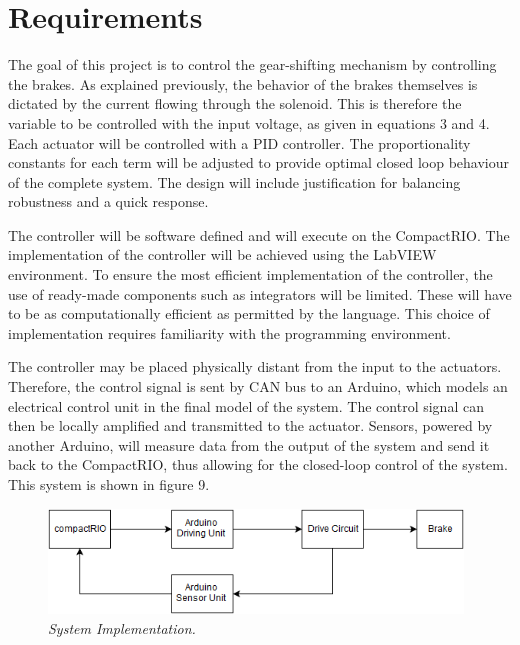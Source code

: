 \documentclass{article}
\begin{document}
\section{Requirements}
\begin{flushleft}
The goal of this project is to control the gear-shifting mechanism by controlling the brakes. As explained previously, the behavior of the brakes themselves is dictated by the current flowing through the solenoid. This is therefore the variable to be controlled with the input voltage, as given in equations 3 and 4. Each actuator will be controlled with a PID controller. The proportionality constants for each term will be adjusted to provide optimal closed loop behaviour of the complete system. The design will include justification for balancing robustness and a quick response. 
\end{flushleft}

\begin{flushleft}
The controller will be software defined and will execute on the CompactRIO. The implementation of the controller will be achieved using the LabVIEW environment. To ensure the most efficient implementation of the controller, the use of ready-made components such as integrators will be limited. These will have to be as computationally efficient as permitted by the language. This choice of implementation requires familiarity with the programming environment. 
\end{flushleft}

\begin{flushleft}
The controller may be placed physically distant from the input to the actuators. Therefore, the control signal is sent by CAN bus to an Arduino, which models an electrical control unit in the final model of the system. The control signal can then be locally amplified and transmitted to the actuator. Sensors, powered by another Arduino, will measure data from the output of the system and send it back to the CompactRIO, thus allowing for the closed-loop control of the system. This system is shown in figure 9.
\end{flushleft}

\begin{figure}[!ht]
\centering 
\includegraphics[width=11cm]{fig_8.png}
\caption{\small \sl System Implementation.}  
\end{figure}
\end{document}
